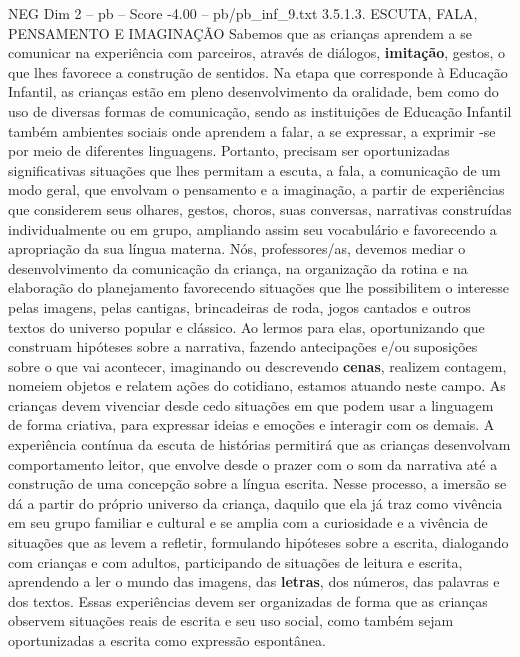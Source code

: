 \begin{textsample}{NEG Dim 2 – pb – Score -4.00 – pb/pb\_inf\_9.txt}  \label{ex:f2_neg_001}
3.5.1.3.
ESCUTA, FALA, PENSAMENTO E IMAGINAÇÃO Sabemos que as crianças aprendem a se comunicar na experiência com parceiros, através de diálogos, \textbf{imitação}, gestos, o que lhes favorece a construção de sentidos.
Na etapa que corresponde à Educação Infantil, as crianças estão em pleno desenvolvimento da oralidade, bem como do uso de diversas formas de comunicação, sendo as instituições de Educação Infantil também ambientes sociais onde aprendem a falar, a se expressar, a exprimir -se por meio de diferentes linguagens.
Portanto, precisam ser oportunizadas significativas situações que lhes permitam a escuta, a fala, a comunicação de um modo geral, que envolvam o pensamento e a imaginação, a partir de experiências que considerem seus olhares, gestos, choros, suas conversas, narrativas construídas individualmente ou em grupo, ampliando assim seu vocabulário e favorecendo a apropriação da sua língua materna.
Nós, professores/as, devemos mediar o desenvolvimento da comunicação da criança, na organização da rotina e na elaboração do planejamento favorecendo situações que lhe possibilitem o interesse pelas imagens, pelas cantigas, brincadeiras de roda, jogos cantados e outros textos do universo popular e clássico.
Ao lermos para elas, oportunizando que construam hipóteses sobre a narrativa, fazendo antecipações e/ou suposições sobre o que vai acontecer, imaginando ou descrevendo \textbf{cenas}, realizem contagem, nomeiem objetos e relatem ações do cotidiano, estamos atuando neste campo.
As crianças devem vivenciar desde cedo situações em que podem usar a linguagem de forma criativa, para expressar ideias e emoções e interagir com os demais.
A experiência contínua da escuta de histórias permitirá que as crianças desenvolvam comportamento leitor, que envolve desde o prazer com o som da narrativa até a construção de uma concepção sobre a língua escrita.
Nesse processo, a imersão se dá a partir do próprio universo da criança, daquilo que ela já traz como vivência em seu grupo familiar e cultural e se amplia com a curiosidade e a vivência de situações que as levem a refletir, formulando hipóteses sobre a escrita, dialogando com crianças e com adultos, participando de situações de leitura e escrita, aprendendo a ler o mundo das imagens, das \textbf{letras}, dos números, das palavras e dos textos.
Essas experiências devem ser organizadas de forma que as crianças observem situações reais de escrita e seu uso social, como também sejam oportunizadas a escrita como expressão espontânea.

\end{textsample}
